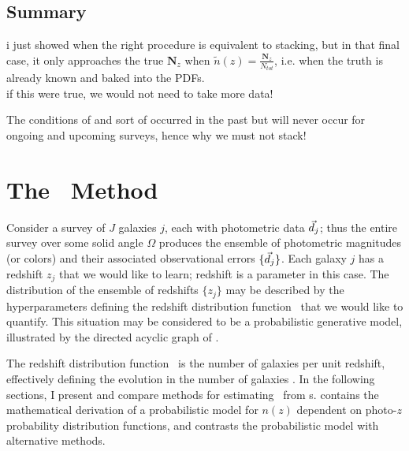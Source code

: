 
\subsection{Summary}

i just showed when the right procedure is equivalent to stacking, but in that final case, it only approaches the true $\textbf{N}_{z}$ when $\tilde{n}(z) = \frac{\textbf{N}_{z}}{N_{tot}}$, i.e. when the truth is already known and baked into the PDFs.\\
if this were true, we would not need to take more data!

The conditions of  and  sort of occurred in the past but will never occur for ongoing and upcoming surveys, hence why we must not stack!

\section{The \Chippr\ Method}


Consider a survey of $J$ galaxies $j$, each with photometric data $\vec{d}_{j}$; thus the entire survey over some solid angle $\Omega$ produces the ensemble of photometric magnitudes (or colors) and their associated observational errors $\{\vec{d}_{j}\}$.  
Each galaxy $j$ has a redshift $z_{j}$ that we would like to learn; redshift is a parameter in this case.  
The distribution of the ensemble of redshifts $\{z_{j}\}$ may be described by the hyperparameters defining the redshift distribution function \nz\ that we would like to quantify.  
This situation may be considered to be a probabilistic generative model, illustrated by the directed acyclic graph of .  

The redshift distribution function \nz\ is the number of galaxies per unit redshift, effectively defining the evolution in the number of galaxies \citep{Menard2013}.  
In the following sections, I present and compare methods for estimating \nz\ from \pzpdf s.  
 contains the mathematical derivation of a probabilistic model for $n(z)$ dependent on photo-$z$ probability distribution functions, and  contrasts the probabilistic model with alternative methods.

